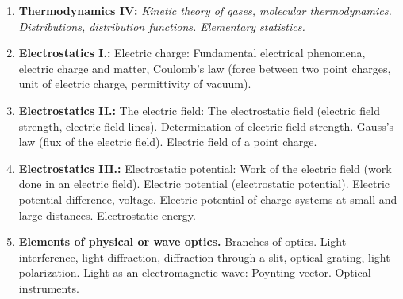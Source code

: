 \documentclass[t,aspectratio=169]{beamer}
\begin{document}
\begin{frame}
\begin{enumerate}
\item \textbf{Thermodynamics IV:} \textit{Kinetic theory of gases, molecular thermodynamics. Distributions, distribution functions. Elementary statistics.}
\item \textbf{Electrostatics I.:} Electric charge: Fundamental electrical phenomena, electric charge and matter, Coulomb’s law (force between two point charges, unit of electric charge, permittivity of vacuum).
\item \textbf{Electrostatics II.:} The electric field: The electrostatic field (electric field strength, electric field lines). Determination of electric field strength. Gauss’s law (flux of the electric field). Electric field of a point charge.
\pagebreak
\item \textbf{Electrostatics III.:} Electrostatic potential: Work of the electric field (work done in an electric field). Electric potential (electrostatic potential). Electric potential difference, voltage. Electric potential of charge systems at small and large distances. Electrostatic energy.
\item \textbf{Elements of physical or wave optics.} Branches of optics. Light interference, light diffraction, diffraction through a slit, optical grating, light polarization. Light as an electromagnetic wave: Poynting vector. Optical instruments.
\end{enumerate}
\end{frame}

\end{document}
